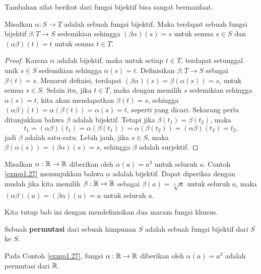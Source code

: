 Tambahan sifat berikut dari fungsi bijektif bisa sangat bermanfaat.

\begin{thm}
\label{thm1.3}
Misalkan $\alpha : S \rightarrow T$ adalah sebuah fungsi bijektif. Maka terdapat sebuah fungsi bijektif $\beta : T \rightarrow S$ sedemikian sehingga $(\beta \alpha)(s) = s$ untuk semua $s \in S$ dan $(\alpha \beta)(t) = t$ untuk semua $t \in T$.
\end{thm}

\begin{proof}
Karena $\alpha$ adalah bijektif, maka untuk setiap $t \in T$, terdapat setunggal unik $s \in S$ sedemikian sehingga $\alpha(s) = t$. Definisikan $\beta : T \rightarrow S$ sebagai $ \beta(t) = s$. Menurut definisi, terdapat $ (\beta \alpha)(s) = \beta(\alpha(s)) = s $, untuk semua $s \in S$. Selain itu, jika $t \in T$, maka dengan memilih $s$ sedemikian sehingga $\alpha(s) = t$, kita akan mendapatkan $\beta(t) = s$, sehingga $ (\alpha \beta)(t) = \alpha(\beta(t)) = \alpha(s) = t $, seperti yang dicari. Sekarang perlu ditunjukkan bahwa $\beta$ adalah bijektif. Tetapi jika $\beta(t_1) = \beta(t_2)$, maka
\[ t_1 = (\alpha \beta)(t_1) = \alpha(\beta(t_1)) = \alpha(\beta(t_2)) = (\alpha \beta)(t_2) = t_2, \]
jadi $\beta$ adalah satu-satu. Lebih jauh, jika $s \in S$, maka $\beta(\alpha(s)) = (\beta \alpha)(s) = s$, sehingga $\beta$ adalah surjektif.
\end{proof}

\begin{exmp}
Misalkan $\alpha : \mathbb{R} \rightarrow \mathbb{R}$ diberikan oleh $\alpha(a) = a^3$ untuk seluruh $a$. Contoh \ref{exmp1.27} menunjukkan bahwa $\alpha$ adalah bijektif. Dapat diperiksa dengan mudah jika kita memilih $\beta : \mathbb{R} \rightarrow \mathbb{R}$ sebagai $\beta(a) = \sqrt[3]{a}$ untuk seluruh $a$, maka $(\alpha \beta)(a) = (\beta \alpha)(a) = a$ untuk seluruh $a$.
\end{exmp}

Kita tutup bab ini dengan mendefinisikan dua macam fungsi khusus.

\begin{defn}
Sebuah \textbf{permutasi} dari sebuah himpunan $S$ adalah sebuah fungsi bijektif dari $S$ ke $S$.
\end{defn}

\begin{exmp}
Pada Contoh \ref{exmp1.27}, fungsi $\alpha : \mathbb{R} \rightarrow \mathbb{R}$ diberikan oleh $\alpha(a) = a^3$ adalah permutasi dari $\mathbb{R}$.
\end{exmp}

